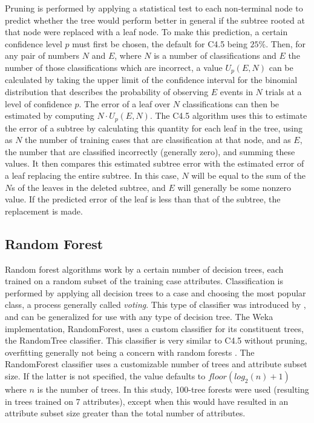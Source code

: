 \documentclass[main.tex]{subfiles}
\begin{document}
Pruning is performed by applying a statistical test to each non-terminal node to predict whether the tree would perform better in general if the subtree rooted at that node were replaced with a leaf node. To make this prediction, a certain confidence level $p$ must first be chosen, the default for C4.5 being $25\%$. Then, for any pair of numbers $N$ and $E$, where $N$ is a number of classifications and $E$ the number of those classifications which are incorrect, a value $U_{p}(E,N)$ can be calculated by taking the upper limit of the confidence interval for the binomial distribution that describes the probability of observing $E$ events in $N$ trials at a level of confidence $p$. The error of a leaf over $N$ classifications can then be estimated by computing $N\cdot U_{p}(E,N)$. The C4.5 algorithm uses this to estimate the error of a subtree by calculating this quantity for each leaf in the tree, using as $N$ the number of training cases that are classification at that node, and as $E$, the number that are classified incorrectly (generally zero), and summing these values. It then compares this estimated subtree error with the estimated error of a leaf replacing the entire subtree. In this case, $N$ will be equal to the sum of the $N$s of the leaves in the deleted subtree, and $E$ will generally be some nonzero value. If the predicted error of the leaf is less than that of the subtree, the replacement is made.

\subsection{Random Forest}

Random forest algorithms work by a certain number of decision trees, each trained on a random subset of the training case attributes. Classification is performed by applying all decision trees to a case and choosing the most popular class, a process generally called \textit{voting}. This type of classifier was introduced by \citet{breiman:2001}, and can be generalized for use with any type of decision tree. The Weka implementation, RandomForest, uses a custom classifier for its constituent trees, the RandomTree classifier. This classifier is very similar to C4.5 without pruning, overfitting generally not being a concern with random forests \citep{breiman:2001}. The RandomForest classifier uses a customizable number of trees and attribute subset size. If the latter is not specified, the value defaults to $floor(log_2(n)+1)$ where $n$ is the number of trees. In this study, 100-tree forests were used (resulting in trees trained on 7 attributes), except when this would have resulted in an attribute subset size greater than the total number of attributes.


\biblio
\end{document}
